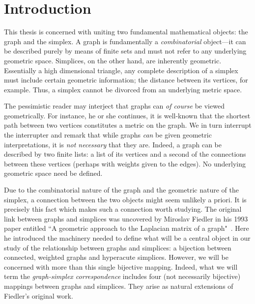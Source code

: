 \chapter{Introduction}
\label{chap:intro}



This thesis is concerned with uniting two fundamental mathematical objects: the graph and the simplex. A graph is fundamentally a  \emph{combinatorial} object---it can be described purely by means of finite sets and must not refer to any underlying geometric space.  
Simplices, on  the other hand, are inherently  geometric. 
Essentially a high dimensional triangle, any complete description of a simplex must include certain geometric information; the distance between its vertices, for example. Thus, a simplex cannot be divorced from an  underlying metric space. 

The pessimistic reader may interject that graphs can \emph{of course} be viewed geometrically. For instance, he or she continues, it  is well-known that the shortest path between two vertices constitutes  a metric on  the graph. We in turn interrupt the interrupter and remark that while graphs \emph{can} be  given  geometric interpretations, it is \emph{not necessary} that  they are. Indeed, a graph can  be described by two finite lists: a list of its vertices and a second of the connections between these vertices (perhaps with  weights  given  to the  edges). No underlying geometric space need be defined. 

Due  to the combinatorial  nature of the graph and the geometric nature of the simplex, a connection between the two objects might seem unlikely a  priori. It is precisely this fact which makes such a connection worth studying. 
The original  link  between graphs and simplices was uncovered by 
Miroslav Fiedler  in his 1993 paper entitled ``A geometric approach to the Laplacian matrix of a graph"~\cite{fiedler1993geometric}. 
Here he introduced the machinery needed  to define what will  be  a central object in our study of the relationship between graphs  and simplices: a bijection between connected, weighted graphs and hyperacute simplices.
However, we will be concerned with more than this single bijective mapping. Indeed, what we will term the \emph{graph-simplex correspondence} includes four (not necessarily bijective) mappings between graphs and simplices. They arise as natural extensions  of  Fiedler's original work. 

